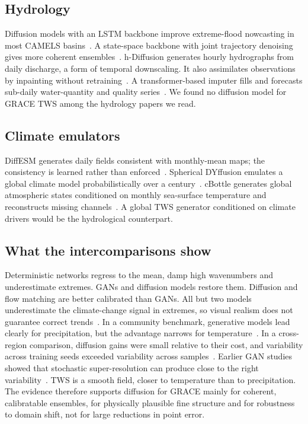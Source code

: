 \subsection{Hydrology}

Diffusion models with an LSTM backbone improve extreme-flood nowcasting in most CAMELS basins~\cite{ou2025drum}. A state-space backbone with joint trajectory denoising gives more coherent ensembles~\cite{wang2025hydrodiffusion}. h-Diffusion generates hourly hydrographs from daily discharge, a form of temporal downscaling. It also assimilates observations by inpainting without retraining~\cite{yang2026hdiffusion}. A transformer-based imputer fills and forecasts sub-daily water-quantity and quality series~\cite{bhavsar2026hydrots}. We found no diffusion model for GRACE TWS among the hydrology papers we read.

\subsection{Climate emulators}

DiffESM generates daily fields consistent with monthly-mean maps; the consistency is learned rather than enforced~\cite{bassetti2024diffesm}. Spherical DYffusion emulates a global climate model probabilistically over a century~\cite{ruhlingcachay2024sphericaldyffusion}. cBottle generates global atmospheric states conditioned on monthly sea-surface temperature and reconstructs missing channels~\cite{brenowitz2025cbottle}. A global TWS generator conditioned on climate drivers would be the hydrological counterpart.

\subsection{What the intercomparisons show}

Deterministic networks regress to the mean, damp high wavenumbers and underestimate extremes. GANs and diffusion models restore them. Diffusion and flow matching are better calibrated than GANs. All but two models underestimate the climate-change signal in extremes, so visual realism does not guarantee correct trends~\cite{rampal2025intercomparison}. In a community benchmark, generative models lead clearly for precipitation, but the advantage narrows for temperature~\cite{rampal2026cordexml}. In a cross-region comparison, diffusion gains were small relative to their cost, and variability across training seeds exceeded variability across samples~\cite{singh2026intercomparison}. Earlier GAN studies showed that stochastic super-resolution can produce close to the right variability~\cite{leinonen2021gan,harris2022gan,price2022precipgen}. TWS is a smooth field, closer to temperature than to precipitation. The evidence therefore supports diffusion for GRACE mainly for coherent, calibratable ensembles, for physically plausible fine structure and for robustness to domain shift, not for large reductions in point error.
